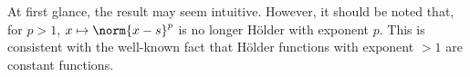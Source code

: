 At first glance, the result may seem intuitive. However, it should be noted that, for $p >1$, $x \mapsto \norm{x -s}^p$ is no longer H\"older with exponent $p$. This is consistent with the well-known fact that H\"older functions with exponent $>1$ are constant functions. 
%
%

